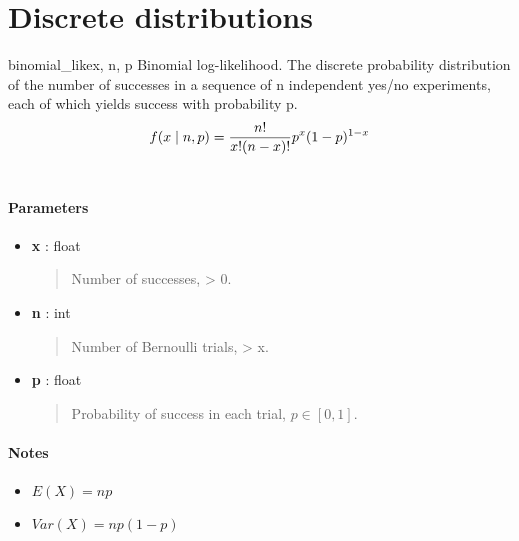 

\section{Discrete distributions}

\hypertarget{pymc.distributions.binomial_like}{}\begin{funcdesc}{binomial\_like}{x, n, p}
Binomial log-likelihood.  The discrete probability distribution of the
number of successes in a sequence of n independent yes/no experiments,
each of which yields success with probability p.
\begin{gather}
\begin{split}f(x \mid n, p) = \frac{n!}{x!(n-x)!} p^x (1-p)^{1-x}\end{split}\notag\\\begin{split}\end{split}\notag
\end{gather}
\paragraph{Parameters}
\begin{itemize}
\item[] \textbf{x} : float
\begin{quote}

Number of successes, \textgreater{} 0.
\end{quote}

\item[]  \textbf{n} : int
\begin{quote}

Number of Bernoulli trials, \textgreater{} x.
\end{quote}

\item[] \textbf{p} : float
\begin{quote}

Probability of success in each trial, $p \in [0,1]$.
\end{quote}
\end{itemize}
\paragraph{Notes}
\begin{itemize}
\item {} 
$E(X)=np$

\item {} 
$Var(X)=np(1-p)$

\end{itemize}
\end{funcdesc}

